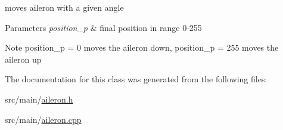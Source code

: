 moves aileron with a given angle 


\begin{DoxyParams}{Parameters}
{\em position\+\_\+p} & final position in range 0-\/255 \\
\hline
\end{DoxyParams}
\begin{DoxyNote}{Note}
position\+\_\+p = 0 moves the aileron down, position\+\_\+p = 255 moves the aileron up 
\end{DoxyNote}


The documentation for this class was generated from the following files\+:\begin{DoxyCompactItemize}
\item 
src/main/\hyperlink{aileron_8h}{aileron.\+h}\item 
src/main/\hyperlink{aileron_8cpp}{aileron.\+cpp}\end{DoxyCompactItemize}
